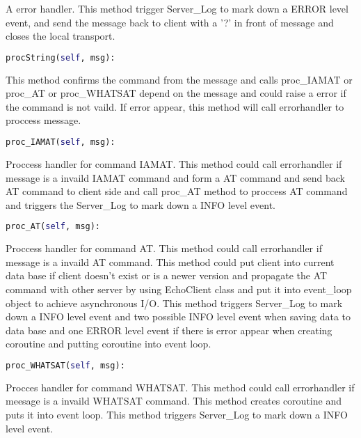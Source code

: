 \documentclass[10pt, a4paper]{IEEEtran}
\begin{document}
    A error handler. This method trigger Server\_Log to mark down a ERROR level event, and send the message back to client with a '?' in front of message and closes the local transport.\\
    \begin{lstlisting}[language=python, frame=single, basicstyle=\footnotesize] 
        procString(self, msg):
    \end{lstlisting}
    This method confirms the command from the message and calls proc\_IAMAT or proc\_AT or proc\_WHATSAT depend on the message and could raise a error if the command is not vaild. If error appear, this method will call errorhandler to proccess message.\\
    \begin{lstlisting}[language=python, frame=single, basicstyle=\footnotesize] 
        proc_IAMAT(self, msg):
    \end{lstlisting}
    Proccess handler for command IAMAT. This method could call errorhandler if message is a invaild IAMAT command and form a AT command and send back AT command to client side and call proc\_AT method to proccess AT command and triggers the Server\_Log to mark down a INFO level event.\\
    \begin{lstlisting}[language=python, frame=single, basicstyle=\footnotesize] 
        proc_AT(self, msg):
    \end{lstlisting}
    Proccess handler for command AT. This method could call errorhandler if message is a invaild AT command. This method could put client into current data base if client doesn't exist or is a newer version and propagate the AT command with other server by using EchoClient class and put it into event\_loop object to achieve asynchronous I/O. This method triggers Server\_Log to mark down a INFO level event and two possible INFO level event when saving data to data base and one ERROR level event if there is error appear when creating coroutine and putting coroutine into event loop.\\

    \begin{lstlisting}[language=python, frame=single, basicstyle=\footnotesize] 
        proc_WHATSAT(self, msg):
    \end{lstlisting}
    Procces handler for command WHATSAT. This method could call errorhandler if meesage is a invaild WHATSAT command. This method creates coroutine and puts it into event loop. This method triggers Server\_Log to mark down a INFO level event.\\
\end{document}
